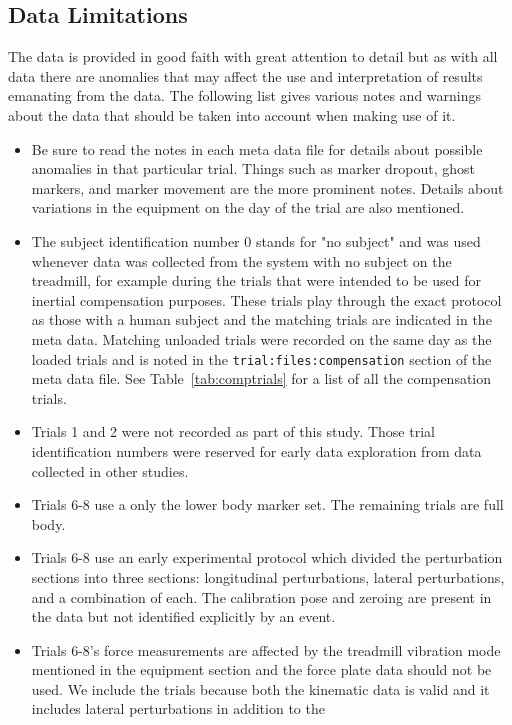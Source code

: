 \documentclass[fleqn,12pt]{wlpeerj}
\begin{document}
\subsection*{Data Limitations}
%
The data is provided in good faith with great attention to detail but as with
all data there are anomalies that may affect the use and interpretation of
results emanating from the data. The following list gives various notes and
warnings about the data that should be taken into account when making use of
it.
%
\begin{itemize}
  \item Be sure to read the notes in each meta data file for details about
    possible anomalies in that particular trial. Things such as marker dropout,
    ghost markers, and marker movement are the more prominent notes. Details
    about variations in the equipment on the day of the trial are also
    mentioned.
  \item The subject identification number 0 stands for "no subject" and was
    used whenever data was collected from the system with no subject on the
    treadmill, for example during the trials that were intended to be used for
    inertial compensation purposes. These trials play through the exact
    protocol as those with a human subject and the matching trials are
    indicated in the meta data. Matching unloaded trials were recorded on the
    same day as the loaded trials and is noted in the
    \verb|trial:files:compensation| section of the meta data file. See
    Table~\ref{tab:comptrials} for a list of all the compensation trials.
  \item Trials 1 and 2 were not recorded as part of this study. Those trial
    identification numbers were reserved for early data exploration from data
    collected in other studies.
  \item Trials 6-8 use a only the lower body marker set. The remaining trials
    are full body.
  \item Trials 6-8 use an early experimental protocol which divided the
    perturbation sections into three sections: longitudinal perturbations,
    lateral perturbations, and a combination of each. The calibration pose and
    zeroing are present in the data but not identified explicitly by an event.
  \item  Trials 6-8's force measurements are affected by the treadmill
    vibration mode mentioned in the equipment section and the force plate data
    should not be used. We include the trials because both the kinematic data
    is valid and it includes lateral perturbations in addition to the

\end{itemize}
\end{document}
